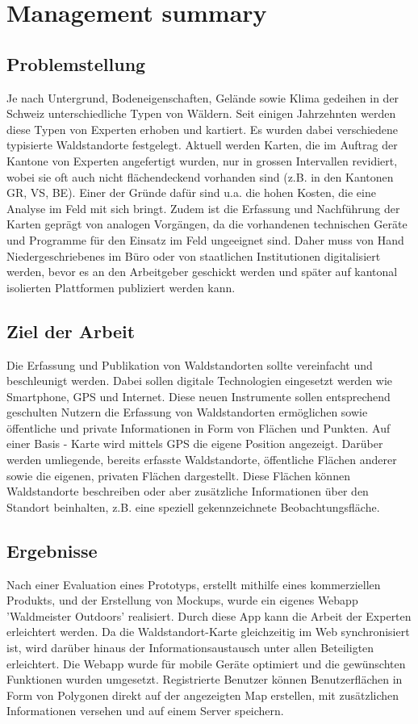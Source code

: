 \renewcommand\thesection{\arabic{section}}
\chapter{Management summary}
\section{Problemstellung}
Je nach Untergrund, Bodeneigenschaften, Gel\"ande sowie Klima gedeihen in der Schweiz unterschiedliche Typen von W\"aldern. Seit einigen Jahrzehnten werden diese Typen von Experten erhoben und kartiert. Es wurden dabei verschiedene typisierte Waldstandorte festgelegt. Aktuell werden Karten, die im Auftrag der Kantone von Experten angefertigt wurden, nur in grossen Intervallen revidiert, wobei sie oft auch nicht fl\"achendeckend vorhanden sind (z.B. in den Kantonen GR, VS, BE).
Einer der Gr\"unde daf\"ur sind u.a. die hohen Kosten, die eine Analyse im Feld mit sich bringt.
Zudem ist die Erfassung und Nachf\"uhrung der Karten gepr\"agt von analogen Vorg\"angen, da die vorhandenen
technischen Ger\"ate und Programme f\"ur den Einsatz im Feld ungeeignet sind.
Daher muss von Hand Niedergeschriebenes im B\"uro oder von staatlichen Institutionen digitalisiert werden, bevor es an den
Arbeitgeber geschickt werden und sp\"ater auf kantonal isolierten Plattformen publiziert werden kann.

\section{Ziel der Arbeit}
Die Erfassung und Publikation von Waldstandorten sollte vereinfacht und beschleunigt werden. Dabei
sollen digitale Technologien eingesetzt werden wie Smartphone, GPS und Internet. Diese neuen
Instrumente sollen entsprechend geschulten Nutzern die Erfassung von Waldstandorten erm\"oglichen sowie \"offentliche und private Informationen in Form von Fl\"achen und Punkten. Auf einer Basis - Karte wird mittels GPS die eigene
Position angezeigt. Dar\"uber werden umliegende, bereits erfasste Waldstandorte, \"offentliche Fl\"achen anderer sowie die eigenen, privaten Fl\"achen dargestellt. Diese Fl\"achen k\"onnen Waldstandorte beschreiben oder aber zus\"atzliche Informationen \"uber den Standort beinhalten, z.B. eine speziell gekennzeichnete Beobachtungsfl\"ache.

\section{Ergebnisse}
Nach einer Evaluation eines Prototyps, erstellt mithilfe eines kommerziellen Produkts,
und der Erstellung von Mockups, wurde ein eigenes Webapp 'Waldmeister Outdoors' realisiert. Durch diese App kann die Arbeit der Experten erleichtert werden. Da die Waldstandort-Karte gleichzeitig im Web synchronisiert
ist, wird dar\"uber hinaus der Informationsaustausch unter allen Beteiligten erleichtert. Die Webapp wurde f\"ur mobile Ger\"ate optimiert und die gew\"unschten Funktionen wurden umgesetzt. Registrierte Benutzer k\"onnen Benutzerfl\"achen in Form von Polygonen direkt auf der angezeigten Map erstellen, mit zus\"atzlichen Informationen versehen und auf einem Server speichern.

